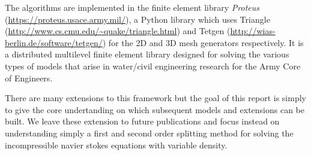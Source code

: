\documentclass[letterpaper]{erdc}
\begin{document}
The algorithms are implemented in the finite element library \textit{Proteus} (\url{https://proteus.usace.army.mil/}), a Python library which uses Triangle (\url{http://www.cs.cmu.edu/~quake/triangle.html}) and Tetgen (\url{http://wias-berlin.de/software/tetgen/}) for the 2D and 3D mesh generators respectively.  It is a distributed multilevel finite element library designed for solving the various types of models that arise in water/civil engineering research for the Army Core of Engineers.

There are many extensions to this framework but the goal of this report is simply to give the core undertanding on which subsequent models and extensions can be built.  We leave these extension to future publications and focus instead on understanding simply a first and second order splitting method for solving the incompressible navier stokes equations with variable density.


%
%
%
%
\end{document}
